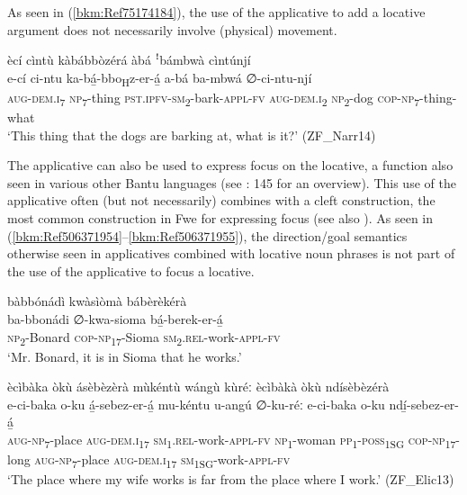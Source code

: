As seen in (\ref{bkm:Ref75174184}), the use of the applicative to add a locative argument does not necessarily involve (physical) movement.

\ea
\label{bkm:Ref75174184}
ècí cìntù kàbábbòzérá àbá ꜝbámbwà cìntúnjí\\
\gll e-cí    ci-ntu    ka-bá̲-bbo\textsubscript{H}z-er-á̲  a-bá    ba-mbwá  ∅-ci-ntu-njí\\
\textsc{aug}-\textsc{dem}.\textsc{i}\textsubscript{7}  \textsc{np}\textsubscript{7}-thing  \textsc{pst}.\textsc{ipfv}-\textsc{sm}\textsubscript{2}-bark-\textsc{appl}-\textsc{fv}
\textsc{aug}-\textsc{dem}.\textsc{i}\textsubscript{2}  \textsc{np}\textsubscript{2}-dog   \textsc{cop}-\textsc{np}\textsubscript{7}-thing-what\\
\glt ‘This thing that the dogs are barking at, what is it?’ (ZF\_Narr14)
\z

The applicative can also be used to express focus on the locative, a function also seen in various other Bantu languages (see \citealt{Pacchiarotti2020}: 145 for an overview). This use of the applicative often (but not necessarily) combines with a cleft construction, the most common construction in Fwe for expressing focus (see also ). As seen in (\ref{bkm:Ref506371954}--\ref{bkm:Ref506371955}), the direction/goal semantics otherwise seen in applicatives combined with locative noun phrases is not part of the use of the applicative to focus a locative.\largerpage[-1]

\ea
\label{bkm:Ref506371954}
bàbbónádì kwàsìòmà bábèrèkérà\\
\gll ba-bbonádi  ∅-kwa-sioma    bá̲-berek-er-á̲\\
\textsc{np}\textsubscript{2}-Bonard  \textsc{cop}-\textsc{np}\textsubscript{17}-Sioma  \textsc{sm}\textsubscript{2}.\textsc{rel}-work-\textsc{appl}-\textsc{fv}\\
\glt ‘Mr. Bonard, it is in Sioma that he works.’
\z

\ea
ècìbàka òkù ásèbèzèrà mùkéntù wángù kùréː ècìbàkà òkù ndísèbèzérà\\
\gll e-ci-baka    o-ku    á̲-sebez-er-á̲ mu-kéntu  u-angú ∅-ku-réː    e-ci-baka    o-ku    ndí̲-sebez-er-á̲\\
\textsc{aug}-\textsc{np}\textsubscript{7}-place  \textsc{aug}-\textsc{dem}.\textsc{i}\textsubscript{17} \textsc{sm}\textsubscript{1}.\textsc{rel}-work-\textsc{appl}-\textsc{fv}
\textsc{np}\textsubscript{1}-woman  \textsc{pp}\textsubscript{1}-\textsc{poss}\textsubscript{1SG}
\textsc{cop}-\textsc{np}\textsubscript{17}-long  \textsc{aug}-\textsc{np}\textsubscript{7}-place  \textsc{aug}-\textsc{dem}.\textsc{i}\textsubscript{17}  \textsc{sm}\textsubscript{1SG}-work-\textsc{appl}-\textsc{fv}\\
\glt ‘The place where my wife works is far from the place where I work.’ (ZF\_Elic13)
\z


